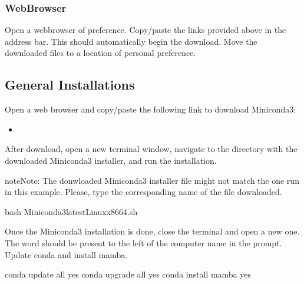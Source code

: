 \documentclass[letterpaper,10pt,english]{sphinxhowto}
\begin{document}
\subsubsection{Web\sphinxhyphen{}Browser}
\label{\detokenize{index:web-browser}}
\sphinxAtStartPar
Open a web\sphinxhyphen{}browser of preference. Copy/paste the links provided above in the address bar. This should automatically begin the download. Move the downloaded files to a location of personal preference.


\subsection{General Installations}
\label{\detokenize{index:general-installations}}
\sphinxAtStartPar
Open a web browser and copy/paste the following link to download Miniconda3:
\begin{itemize}
\item {} 
\sphinxAtStartPar
{}

\end{itemize}

\sphinxAtStartPar
After download, open a new terminal window, navigate to the directory with the downloaded Miniconda3 installer, and run the installation.

\begin{sphinxadmonition}{note}{Note:}
\sphinxAtStartPar
The donwloaded Miniconda3 installer file might not match the one run in this example. Please, type the corresponding name of the  file downloaded.
\end{sphinxadmonition}

\begin{sphinxVerbatim}[commandchars=\\\{\}]
\PYGZdl{} bash Miniconda3\PYGZhy{}latest\PYGZhy{}Linux\PYGZhy{}x86\PYGZus{}64.sh
\end{sphinxVerbatim}

\sphinxAtStartPar
Once the Miniconda3 installation is done, close the terminal and open a new one. The word  should be present to the left of the computer name in the prompt. Update conda and install mamba.

\begin{sphinxVerbatim}[commandchars=\\\{\}]
\PYGZdl{} conda update \PYGZhy{}\PYGZhy{}all \PYGZhy{}\PYGZhy{}yes
\PYGZdl{} conda upgrade \PYGZhy{}\PYGZhy{}all \PYGZhy{}\PYGZhy{}yes
\PYGZdl{} conda install mamba \PYGZhy{}\PYGZhy{}yes
\end{sphinxVerbatim}
\end{document}
